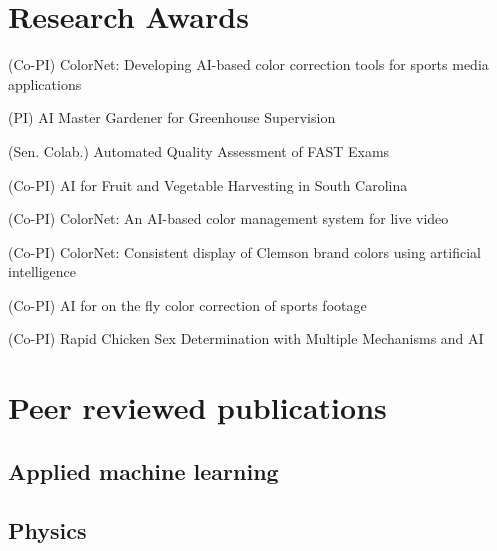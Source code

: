 \documentclass[11pt,letterpaper,roman]{moderncv}        %
\begin{document}

\section{Research Awards}
\quad (Co-PI) ColorNet: Developing AI-based color correction tools for sports media applications

\quad (PI) AI Master Gardener for Greenhouse Supervision

\quad (Sen. Colab.) Automated Quality Assessment of FAST Exams

\quad (Co-PI) AI for Fruit and Vegetable Harvesting in South Carolina

\quad (Co-PI) ColorNet: An AI-based color management system for live video

\quad (Co-PI) ColorNet: Consistent display of Clemson brand colors using artificial intelligence

\quad (Co-PI) AI for on the fly color correction of sports footage

\quad (Co-PI) Rapid Chicken Sex Determination with Multiple Mechanisms and AI


\section{Peer reviewed publications}
\subsection{Applied machine learning}

\begin{refsection}
  \nocite{*}
  \printbibliography[heading=none]
\end{refsection}

\subsection{Physics}
\end{document}
